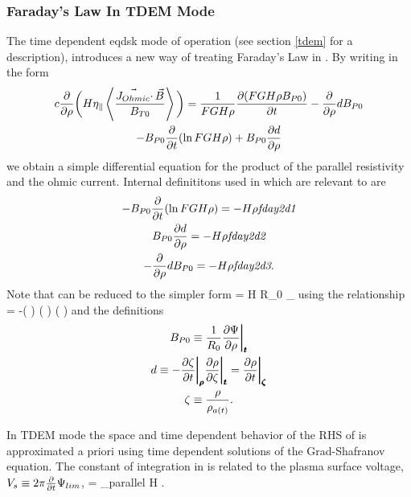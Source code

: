 \subsubsection{Faraday's Law In TDEM Mode}\label{fday2}

The time dependent eqdsk mode of operation (see section \ref{tdem} for a
description), introduces a new way of treating Faraday's Law in \ot.  By writing
 in the form 
\begin{multline}
 c\frac{\partial}{\partial \rho} \bigg( H\eta_{\parallel} \left \langle
  \frac{\vec{J_{Ohmic}} \cdotp \vec {B}}{B_{T0}} \right \rangle \bigg )
 = \frac{1}{FGH\rho } \frac{\partial{ (FGH\rho B_{P0})}}{\partial{ t}}-\frac{\partial}{\partial \rho}{dB_{P0}}\\  
 - B_{P0}\frac{\partial}{\partial t} (\ln{FGH\rho})+ B_{P0}\frac{\partial{ d}}{\partial{ \rho}} 
 \label{eq:fday2_1}
\end{multline}
we obtain a simple differential equation for the product of the parallel
resistivity and the ohmic current. Internal definititons used in \ot which are
relevant to  are
\begin{gather}
 -B_{P0}\frac{\partial}{\partial t} (\ln{FGH\rho}) = -H\rho\emph{fday2d1} \\
 B_{P0}\frac{\partial{ d}}{\partial{ \rho}} = -H\rho\emph{fday2d2} \\
 -\frac{\partial}{\partial \rho}{dB_{P0}} = -H\rho \emph{fday2d3} .
\end{gather}
Note that  can be reduced to the simpler form 
\beq
 \Psi = H R_0 \eta_{\parallel}  \left \langle 
   \right \rangle
 \label{eq:fday2_4}
\eeq
using the relationship
\beq
 \pmb{\bigg \vert_\rho} = 
  \pmb{\bigg \vert_\zeta} 
 -\bigg ( \bigg )
 \bigg (  \pdiff{\Psi}{\zeta}\bigg ) 
 \bigg(\pmb{\bigg \vert_\zeta} \bigg ) 
\eeq
and the definitions
\begin{gather}
 B_{P0}\equiv\frac{1}{R_0}\frac{\partial{ \Psi}}{\partial{ \rho}}\pmb{\bigg \vert_t} \\
 d \equiv -\frac{\partial{ \zeta}}{\partial{ t}}\pmb{\bigg \vert_{\rho}}\frac{\partial{ \rho}}{\partial{ \zeta}}
  \pmb{\bigg \vert_t} = \frac{\partial{ \rho}}{\partial{ t}}\pmb {\bigg \vert_\zeta}\\
 \zeta \equiv \frac{\rho}{\rho_{a(t)}}.
\end{gather}

In TDEM mode the space and time dependent behavior of the RHS of
 is approximated a priori using time dependent solutions of
the Grad-Shafranov equation. The constant of integration in 
is related to the plasma surface voltage, 
$V_s \equiv 2\pi\frac{\partial}{\partial t}\Psi_{lim} $,
\beq
  = \eta_{parallel} H 
 \left \langle {} \right \rangle
 .
\eeq

